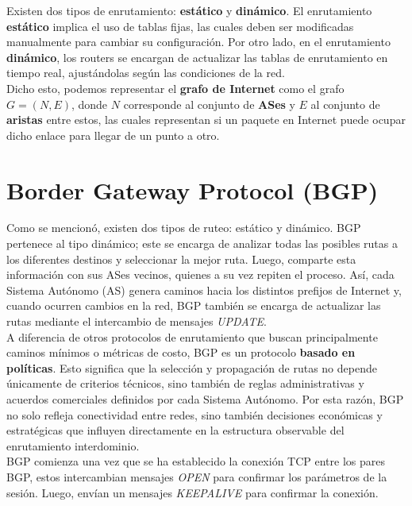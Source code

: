 Existen dos tipos de enrutamiento: \textbf{estático} y \textbf{dinámico}. 
El enrutamiento \textbf{estático} implica el uso de tablas fijas, las cuales deben ser modificadas manualmente para cambiar su configuración. 
Por otro lado, en el enrutamiento \textbf{dinámico}, los routers se encargan de actualizar las tablas de enrutamiento en tiempo real, ajustándolas según las condiciones de la red.\\


Dicho esto, podemos representar el \textbf{grafo de Internet} como el grafo \textbf{$G = (N, E)$}, donde $N$ corresponde al conjunto de \textbf{ASes} y $E$ al conjunto de \textbf{aristas} entre estos, las cuales representan si un paquete en Internet puede ocupar dicho enlace para llegar de un punto a otro.

\section{Border Gateway Protocol (\textbf{BGP})}

Como se mencionó, existen dos tipos de ruteo: estático y dinámico. 
BGP~\cite{RFC-BGP} pertenece al tipo dinámico; este se encarga de analizar todas las posibles rutas a los diferentes destinos y seleccionar la mejor ruta. 
Luego, comparte esta información con sus ASes vecinos, quienes a su vez repiten el proceso. 
Así, cada Sistema Autónomo (AS) genera caminos hacia los distintos prefijos de Internet y, cuando ocurren cambios en la red, BGP también se encarga de actualizar las rutas mediante el intercambio de mensajes \textit{UPDATE}.\\

A diferencia de otros protocolos de enrutamiento que buscan principalmente caminos mínimos o métricas de costo, BGP es un protocolo \textbf{basado en políticas}. Esto significa que la selección y propagación de rutas no depende únicamente de criterios técnicos, sino también de reglas administrativas y acuerdos comerciales definidos por cada Sistema Autónomo. Por esta razón, BGP no solo refleja conectividad entre redes, sino también decisiones económicas y estratégicas que influyen directamente en la estructura observable del enrutamiento interdominio.\\

BGP comienza una vez que se ha establecido la conexión TCP entre los pares BGP, estos intercambian mensajes \textit{OPEN} para confirmar los parámetros de la sesión. Luego, envían un mensajes \textit{KEEPALIVE} para confirmar la conexión.\\

